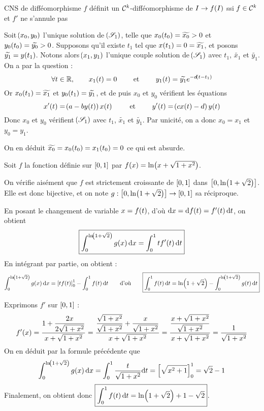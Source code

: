 \documentclass[a4paper,french,bookmarks]{article}
\begin{document}
    \begin{property}{CNS de difféomorphisme}{}
        $f$ définit un $\mathcal{C}^k$-difféomorphisme de $I \rightarrow f\!\left(I\right)$ ssi $f \in \mathcal{C}^k$ et $f'$ ne s'annule pas
    \end{property}
    
    \newpage
    
    Soit $\!\left(x_0, y_0\right)$ l'unique solution de $\!\left(\mathscr{S}_1\right)$, telle que $x_0\!\left(t_0\right) = \widetilde{x_0} > 0$ et $y_0\!\left(t_0\right) = \widetilde{y_0} > 0$. Supposons qu'il existe $t_1$ tel que $x\!\left(t_1\right) = 0 = \widetilde{x_1}$, et posons $\widetilde{y_1} = y\!\left(t_1\right)$. Notons alors $\!\left(x_1, y_1\right)$ l'unique couple solution de $\!\left(\mathscr{S}_1\right)$ avec $t_1$, $\widetilde{x_1}$ et $\widetilde{y_1}$. On a par la question  :
    \[ \forall t \in \mathbb{R},\qquad x_1\!\left(t\right) = 0 \qquad\ \text{et} \ \qquad y_1\!\left(t\right) = \widetilde{y_1}e^{-d\!\left(t - t_1\right)}\]
    Or $x_0\!\left(t_1\right) = \widetilde{x_1}$ et $y_0\!\left(t_1\right) = \widetilde{y_1}$, et de puis $x_0$ et $y_0$ vérifient les équations 
    \[ x'\p{t} = \p{a - by\p{t}}x\p{t} \qquad\et\qquad y'\p{t} = \p{cx\p{t} - d}y\p{t}\]
    Donc $x_0$ et $y_0$ vérifient $\!\left(\mathscr{S}_1\right)$ avec $t_1$, $\widetilde{x_1}$ et $\widetilde{y_1}$. Par unicité, on a donc $x_0 = x_1$ et $y_0 = y_1$.
    
    On en déduit $\widetilde{x_0} = x_0\!\left(t_0\right) = x_1\!\left(t_0\right) = 0$ ce qui est absurde.
    
    \newpage
    
    Soit $f$ la fonction définie sur $\left[0, 1\right]$ par $f\p{x} = \ln{x + \sqrt{1 + x^2}}$.
    
    \begin{enumerate}
        \itt On vérifie aisément que $f$ est strictement croissante de $\left[0, 1\right]$ dans $\intc{0, \ln{1 + \sqrt{2}}}$. Elle est donc bijective, et on note $g : \intc{0, \ln{1 + \sqrt{2}}} \to \intc{0, 1}$ sa réciproque.
        
        \itt En posant le changement de variable $x = f\!\left(t\right)$, d'où $\mathrm d x = \mathrm d f\!\left(t\right) = f'\!\left(t\right)\mathrm d t$, on obtient 
        \[ \boxed{\int_0^{\ln{1 + \sqrt{2}}} g\p{x}\dif x = \int_0^1 tf'\p{t}\dif t} \]
        En intégrant par partie, on obtient :
        \[ \int_0^{\ln{1 + \sqrt{2}}} g\p{x}\dif x = \intc{tf\p{t}}_0^1 - \int_0^1 f\p{t}\dif t \qquad\text{d'où}\qquad \boxed{\int_0^1 f\p{t}\dif t = \ln{1 + \sqrt{2}} - \int_0^{\ln{1 + \sqrt{2}}} g\p{t}\dif t}\]
        
        \itt Exprimons $f'$ sur $\left[0, 1\right]$ :
        \[ f'\!\left(x\right) = \dfrac{1 + \dfrac{2x}{2\sqrt{1 + x^2}}}{x + \sqrt{1 + x^2}} = \dfrac{\dfrac{\sqrt{1 + x^2}}{\sqrt{1 + x^2}} + \dfrac{x}{\sqrt{1 + x^2}}}{x + \sqrt{1 + x^2}} = \dfrac{\dfrac{x + \sqrt{1 + x^2}}{\sqrt{1 + x^2}}}{x + \sqrt{1 + x^2}} = \dfrac{1}{\sqrt{1 + x^2}}\]
        On en déduit par la formule précédente que 
        \[ \int_0^{\ln{1 + \sqrt{2}}} g\p{x}\dif x = \int_0^1\dfrac{t}{\sqrt{1 + x^2}}\dif t = \intc{\sqrt{x^2 + 1}}_0^1 = \sqrt{2} - 1\]
        Finalement, on obtient donc $\boxed{\displaystyle \int_0^1 f\p{t}\dif t = \ln{1 + \sqrt{2}} + 1 - \sqrt{2}}$.
    \end{enumerate}
    
    
    
\end{document}
